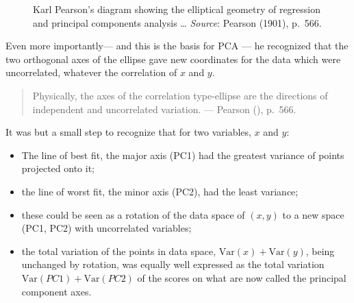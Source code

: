 \documentclass[
  letterpaper,
  10pt,
  krantz2]{krantz}
\providecommand{\tightlist}{%
  \setlength{\itemsep}{0pt}\setlength{\parskip}{0pt}}\usepackage{longtable,booktabs,array}
\begin{document}
{\begin{figure}


\caption{\label{fig-Pearson1901-2}Karl Pearson's diagram showing the
elliptical geometry of regression and principal components analysis
\ldots{} \emph{Source}: Pearson (1901), p.~566.}

\end{figure}%

Even more importantly--- and this is the basis for PCA --- he recognized
that the two orthogonal axes of the ellipse gave new coordinates for the
data which were uncorrelated, whatever the correlation of \(x\) and
\(y\).

\begin{quote}
Physically, the axes of the correlation type-ellipse are the directions
of independent and uncorrelated variation. --- Pearson
(), p.~566.
\end{quote}

It was but a small step to recognize that for two variables, \(x\) and
\(y\):

\begin{itemize}
\tightlist
\item
  The line of best fit, the major axis (PC1) had the greatest variance
  of points projected onto it;
\item
  the line of worst fit, the minor axis (PC2), had the least variance;
\item
  these could be seen as a rotation of the data space of \((x, y)\) to a
  new space (PC1, PC2) with uncorrelated variables;
\item
  the total variation of the points in data space,
  \(\text{Var}(x) + \text{Var}(y)\), being unchanged by rotation, was
  equally well expressed as the total variation
  \(\text{Var}(PC1) + \text{Var}(PC2)\) of the scores on what are now
  called the principal component axes.
\end{itemize}

}
\end{document}
